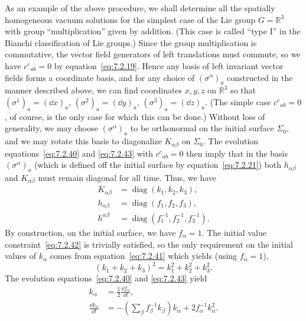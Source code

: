 As an example of the above procedure, we shall determine all the spatially
homogeneous vacuum solutions for the simplest case of the Lie group
\(G=\mathbb R^3\) with group “multiplication” given by addition. (This case is
called “type I” in the Bianchi classification of Lie groups.) Since the group
multiplication is commutative, the vector field generators of left translations must
commute, so we have \(c^c{}_{ab}=0\) by equation~\eqref{eq:7.2.19}. Hence any
basis of left invariant vector fields forms a coordinate basis, and for any choice of
\((\sigma^\alpha)_a\) constructed in the manner described above, we can find
coordinates \(x,y,z\) on \(\mathbb R^3\) so that
\((\sigma^1)_a=(\dd x)_a\), \((\sigma^2)_a=(\dd y)_a\),
\((\sigma^3)_a=(\dd z)_a\). (The simple case \(c^c{}_{ab}=0\), of course, is the
only case for which this can be done.) Without loss of generality, we may choose
\((\sigma^\alpha)_a\) to be orthonormal on the initial surface \(\Sigma_0\), and
we may rotate this basis to diagonalize \(K_{\alpha\beta}\) on \(\Sigma_0\). The
evolution equations~\eqref{eq:7.2.40} and \eqref{eq:7.2.43} with
\(c^c{}_{ab}=0\) then imply that in the basis \((\sigma^\alpha)_a\) (which is
defined off the initial surface by equation~\eqref{eq:7.2.21}) both
\(h_{\alpha\beta}\) and \(K_{\alpha\beta}\) must remain diagonal for all time.
Thus, we have
\begin{align}
  K_{\alpha\beta}&=\operatorname{diag}(k_1,k_2,k_3) ,
  \tag{7.2.44}\label{eq:7.2.44}\\
  h_{\alpha\beta}&=\operatorname{diag}(f_1,f_2,f_3) ,
  \tag{7.2.45}\label{eq:7.2.45}\\
  h^{\alpha\beta}&=\operatorname{diag}(f_1^{-1},f_2^{-1},f_3^{-1}) .
  \tag{7.2.46}\label{eq:7.2.46}
\end{align}
By construction, on the initial surface, we have \(f_\alpha=1\). The initial value
constraint~\eqref{eq:7.2.42} is trivially satisfied, so the only requirement on the
initial values of \(k_\alpha\) comes from equation~\eqref{eq:7.2.41} which yields
(using \(f_\alpha=1\)),
\begin{equation}
  (k_1+k_2+k_3)^2=k_1^2+k_2^2+k_3^2 .
  \tag{7.2.47}\label{eq:7.2.47}
\end{equation}
The evolution equations~\eqref{eq:7.2.40} and \eqref{eq:7.2.43} yield
\begin{align}
  k_\alpha&=\frac12\frac{\dd f_\alpha}{\dd t} ,
  \tag{7.2.48}\label{eq:7.2.48}\\
  \frac{\dd k_\alpha}{\dd t}
    &=-\left(\sum_\beta f_\beta^{-1}k_\beta\right)k_\alpha
      +2f_\alpha^{-1}k_\alpha^2 .
  \tag{7.2.49}\label{eq:7.2.49}
\end{align}
